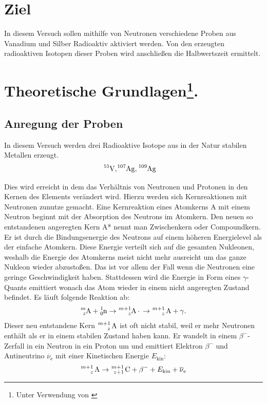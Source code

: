 \section{Ziel}
In diesem Versuch sollen mithilfe von Neutronen verschiedene Proben aus Vanadium und Silber
 Radioaktiv aktiviert werden.
Von den erzeugten radioaktiven Isotopen dieser Proben wird anschließen die Halbwertszeit ermittelt.

\section[Theoretische Grundlagen]{Theoretische Grundlagen\footnote[1]{Unter Verwendung von \cite{man:v702}}.}


\subsection{Anregung der Proben}

\noindent
In diesem Versuch werden drei Radioaktive Isotope aus in der Natur stabilen Metallen erzeugt.
\begin{align}
    \ce{^{51}V}, & \ce{^{107}Ag},  \ce{^{109}Ag}
\end{align}

Dies wird erreicht in dem das Verhältnis von Neutronen und Protonen in den Kernen des Elements verändert wird.
Hierzu werden sich Kernreaktionen mit Neutronen zunutze gemacht.
Eine Kernreaktion eines Atomkerns A mit einem Neutron beginnt mit der Absorption des Neutrons im Atomkern.
Den neuen so entstandenen angeregten Kern A* nennt man Zwischenkern oder Compoundkern.
Er ist durch die Bindungsenergie des Neutrons auf einem höheren Energielevel als der einfache Atomkern.
Diese Energie verteilt sich auf die gesamten Nukleonen, weshalb die Energie des Atomkerns meist nicht mehr ausreicht
um das ganze Nukleon wieder abzustoßen.
Das ist vor allem der Fall wenn die Neutronen eine geringe Geschwindigkeit haben.
Stattdessen wird die Energie in Form eines $\gamma$-Quants emittiert wonach das Atom wieder in einem nicht angeregten Zustand befindet.
Es läuft folgende Reaktion ab:
\begin{align*}
    \ce{^{m}_{z}A} + \ce{^{1}_{0}n} \rightarrow \ce{^{m+1}_{z}A*} \rightarrow \ce{^{m+1}_{z} A} + \gamma .
\end{align*}
Dieser neu entstandene Kern $\ce{^{m+1}_{z} A}$ ist oft nicht stabil, weil er mehr Neutronen enthält
als er in einem stabilen Zustand haben kann.
Er wandelt in einem $\beta^{-}$-Zerfall in ein Neutron in ein Proton um und emittiert 
Elektron $\beta^{-}$ und Antineutrino $\overline{\nu}_\text{e}$ mit einer Kinetischen Energie $E_\text{kin}$:
\begin{align*}
    \ce{^{m+1}_{z} A} \rightarrow \ce{^{m+1}_{z+1} C} + \beta^{-} + E_\text{kin} + \overline{\nu}_\text{e}
\end{align*}

